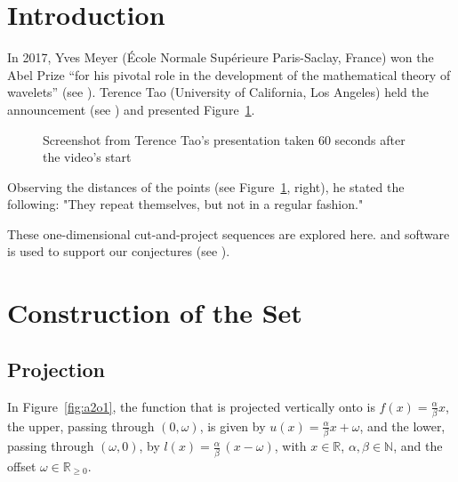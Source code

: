 \documentclass[11pt]{article}
\theoremstyle{remark}
\begin{document}
\section{Introduction}

In 2017, Yves Meyer (École Normale Supérieure Paris-Saclay, France) won the Abel Prize “for his pivotal role in the development of the mathematical theory of wavelets” (see \cite{AbelPriceYvesMeyer}).
%
Terence Tao (University of California, Los Angeles) held the announcement (see \cite{SpeechTao}) and presented Figure~\ref{fig:MeyerSets}.
%
\begin{figure}[htbp]
    \centering
    \caption{Screenshot from Terence Tao's presentation taken 60 seconds after the video's start}
    \label{fig:MeyerSets}
\end{figure}

Observing the distances of the points (see Figure~\ref{fig:MeyerSets}, right), he stated the following: "They repeat themselves, but not in a regular fashion."

These one-dimensional cut-and-project sequences are explored here. \langc and \langp software is used to support our conjectures (see \cite{Kunert2025}).

\section{Construction of the Set}

\subsection{Projection}

In Figure~\ref{fig:a2o1}, 
the function that is projected vertically onto is $f(x) = \frac{\alpha}{\beta} x$, 
the upper, passing through $(0, \omega)$, is given by $u(x) = \frac{\alpha}{\beta} x + \omega$, 
and the lower, passing through $(\omega, 0)$, by $l(x) = \frac{\alpha}{\beta} \, (x - \omega)$, 
with $x \in \mathbb{R}$, $\alpha, \beta \in \mathbb{N}$, and the offset $\omega \in \mathbb{R}_{\ge 0}$.
\end{document}
